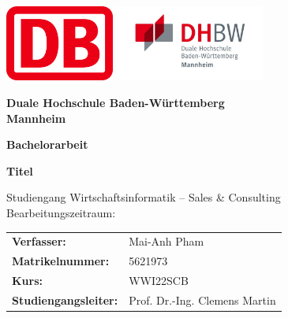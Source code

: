 \begin{titlepage}
    \thispagestyle{empty}
  
    \begin{center}
      \vspace*{-1cm}
      \includegraphics[height=2.5cm]{bilder/DB_logo_red_filled_1000px_rgb.png}
      \hfill
      \includegraphics[height=2.5cm]{bilder/DHBW_MA_Logo.jpg}
  
      \vspace{1.5cm}
  
      {\Large\bfseries
      Duale Hochschule Baden-Württemberg\\
      Mannheim}
  
      \vspace{1cm}
  
      {\large\bfseries Bachelorarbeit}
  
      \vspace{1cm}
  
      {\LARGE\bfseries
      Titel
      }
  
      \vspace{1cm}
  
      {\large
      Studiengang Wirtschaftsinformatik – Sales \& Consulting\\
      Bearbeitungszeitraum:
      }
  
      \vfill
    \end{center}
  
    {\setlength{\parindent}{0pt} %
  
    \vspace{1.5cm}

    \newcommand{\eintrag}[2]{\textbf{#1} & \begin{minipage}[t]{\dimexpr\linewidth-5cm}\raggedright #2\end{minipage} \\}

\begin{tabular}{@{}p{4.8cm}l@{}}
  \eintrag{Verfasser:}{Mai-Anh Pham}
  \eintrag{Matrikelnummer:}{5621973}
  \eintrag{Kurs:}{WWI22SCB}
  \eintrag{Studiengangsleiter:}{Prof. Dr.-Ing. Clemens Martin}
\end{tabular}

}
\end{titlepage}
